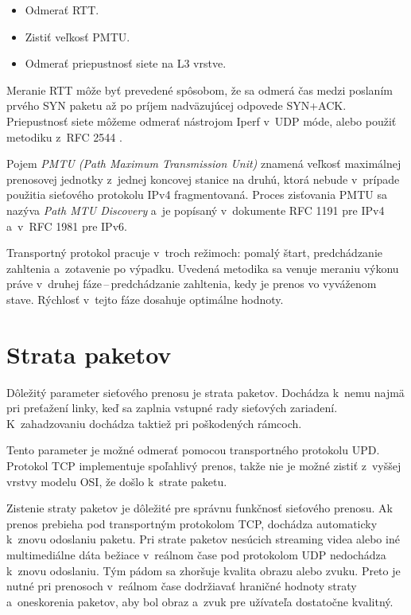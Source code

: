     \begin{itemize}
        \item Odmerať RTT.
        \item Zistiť veľkosť PMTU.
        \item Odmerať priepustnosť siete na L3 vrstve.
    \end{itemize}

    Meranie RTT môže byť prevedené spôsobom, že sa odmerá
    čas medzi poslaním prvého SYN paketu až po príjem nadväzujúcej odpovede 
    SYN+ACK. Priepustnosť siete môžeme odmerať nástrojom Iperf v~UDP móde, alebo 
    použiť metodiku z~RFC 2544 \cite{rfc_2544}.

    Pojem \emph{PMTU (Path Maximum Transmission Unit)} znamená veľkosť
    maximálnej prenosovej jednotky z~jednej koncovej stanice na druhú, ktorá 
    nebude v~prípade použitia sieťového protokolu IPv4 fragmentovaná. Proces
    zisťovania PMTU sa nazýva \emph{Path MTU Discovery} a~je popísaný
    v~dokumente RFC 1191 \cite{rfc_ipv4_pmtud} pre IPv4 a~v~RFC 1981
    \cite{rfc_ipv6_pmtud} pre IPv6. 

    Transportný protokol pracuje v~troch režimoch: pomalý štart, predchádzanie
    zahltenia a~zotavenie po výpadku. Uvedená metodika sa venuje meraniu výkonu 
    práve v~druhej fáze\,--\,predchádzanie zahltenia, kedy je prenos vo vyváženom 
    stave. Rýchlosť v~tejto fáze dosahuje optimálne hodnoty.

\section{Strata paketov} \label{loss}
Dôležitý parameter sieťového prenosu je strata paketov. Dochádza k~nemu najmä
pri preťažení linky, keď sa zaplnia vstupné rady sieťových zariadení.
K~zahadzovaniu dochádza taktiež pri poškodených rámcoch.

Tento parameter je možné odmerať pomocou transportného protokolu UPD. Protokol TCP
implementuje spoľahlivý prenos, takže nie je možné zistiť z~vyššej vrstvy
modelu OSI, že došlo k~strate paketu. 

Zistenie straty paketov je dôležité pre správnu funkčnosť sieťového prenosu.
Ak prenos prebieha pod
transportným protokolom TCP, dochádza automaticky k~znovu odoslaniu paketu. Pri strate
paketov nesúcich streaming videa alebo iné multimediálne dáta bežiace v~reálnom
čase pod protokolom UDP nedochádza k~znovu odoslaniu. Tým pádom sa zhoršuje
kvalita obrazu alebo zvuku. Preto je nutné pri prenosoch v~reálnom čase
dodržiavať hraničné hodnoty straty a~oneskorenia paketov, aby bol obraz a~zvuk pre
užívateľa dostatočne kvalitný.


